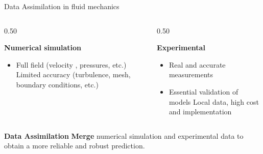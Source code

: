 \documentclass[10pt, aspectratio=169, dvipsnames]{beamer}
\begin{document}
    \begin{frame}{Data Assimilation in fluid mechanics}
        \vspace{-0.4cm}
        \begin{columns}[T] %
            \begin{column}{0.50\textwidth}
                \begin{block}{\textbf{Numerical simulation}}%
                    \begin{itemize}
                        \item Full field (velocity , pressures, etc.)
                        \baditem Limited accuracy (turbulence, mesh, boundary conditions, etc.)
                    \end{itemize}
                \end{block}
            \end{column}

            \begin{column}{0.50\textwidth}
                \begin{block}{\textbf{Experimental}}%
                    \begin{itemize}
                        \item Real and accurate measurements%
                        \item Essential validation of models%
                        \baditem Local data, high cost and implementation%
                    \end{itemize}
                \end{block}
            \end{column}
        \end{columns}

        \centering
        \begin{block}{\textbf{Data Assimilation}}%
            \textbf{Merge} numerical simulation and experimental data to obtain a more reliable and robust prediction.
        \end{block}


\end{frame}
\end{document}
